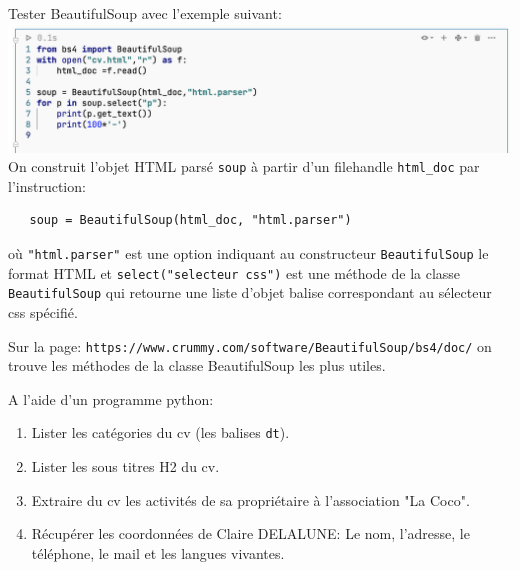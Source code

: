 \documentclass[a4paper]{article}
\begin{document}
Tester BeautifulSoup avec l'exemple suivant:
\\
\includegraphics[scale=0.58]{pgm1.png} 
\\
On construit l'objet HTML parsé {\tt soup} à partir d'un filehandle  {\tt html\_doc} par l'instruction: 
\begin{verbatim}
   soup = BeautifulSoup(html_doc, "html.parser")
\end{verbatim}
où {\tt "html.parser"} est une option indiquant au constructeur {\tt BeautifulSoup} le format HTML et {\tt select("selecteur css")} est une méthode de la classe {\tt BeautifulSoup} qui retourne une liste d'objet balise correspondant au sélecteur css spécifié.  

Sur la page: {\tt https://www.crummy.com/software/BeautifulSoup/bs4/doc/} on trouve les méthodes de la classe BeautifulSoup les plus utiles.

A l'aide d'un programme python:
\begin{enumerate}
\item Lister les catégories du cv (les balises {\tt dt}).
\item Lister les sous titres H2 du cv.
\item Extraire du cv les activités de sa propriétaire à l'association "La Coco". 
\item Récupérer les coordonnées de Claire DELALUNE: Le nom, l'adresse, le téléphone, le mail et les langues vivantes.
\end{enumerate}
\end{document}
